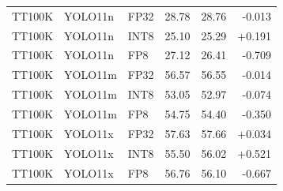 \begin{tabular}{lllrrr}
TT100K & YOLO11n & FP32 & 28.78 & 28.76 & -0.013 \\
TT100K & YOLO11n & INT8 & 25.10 & 25.29 & +0.191 \\
TT100K & YOLO11n & FP8 & 27.12 & 26.41 & -0.709 \\
TT100K & YOLO11m & FP32 & 56.57 & 56.55 & -0.014 \\
TT100K & YOLO11m & INT8 & 53.05 & 52.97 & -0.074 \\
TT100K & YOLO11m & FP8 & 54.75 & 54.40 & -0.350 \\
TT100K & YOLO11x & FP32 & 57.63 & 57.66 & +0.034 \\
TT100K & YOLO11x & INT8 & 55.50 & 56.02 & +0.521 \\
TT100K & YOLO11x & FP8 & 56.76 & 56.10 & -0.667 \\
\bottomrule
\end{tabular}
